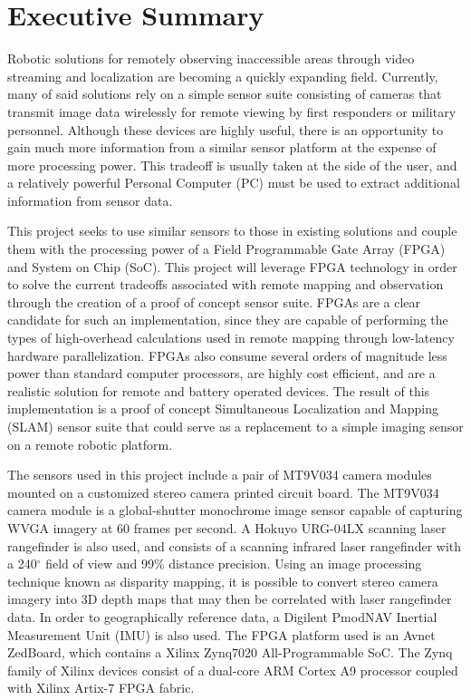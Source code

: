 {}
\section*{Executive Summary}

Robotic solutions for remotely observing inaccessible areas through video streaming and localization are becoming a quickly expanding field. Currently, many of said solutions rely on a simple sensor suite consisting of cameras that transmit image data wirelessly for remote viewing by first responders or military personnel. Although these devices are highly useful, there is an opportunity to gain much more information from a similar sensor platform at the expense of more processing power. This tradeoff is usually taken at the side of the user, and a relatively powerful Personal Computer (PC) must be used to extract additional information from sensor data. 
\par
This project seeks to use similar sensors to those in existing solutions and couple them with the processing power of a Field Programmable Gate Array (FPGA) and System on Chip (SoC). This project will leverage FPGA technology in order to solve the current tradeoffs associated with remote mapping and observation through the creation of a proof of concept sensor suite. FPGAs are a clear candidate for such an implementation, since they are capable of performing the types of high-overhead calculations used in remote mapping through low-latency hardware parallelization. FPGAs also consume several orders of magnitude less power than standard computer processors, are highly cost efficient, and are a realistic solution for remote and battery operated devices. The result of this implementation is a proof of concept Simultaneous Localization and Mapping (SLAM) sensor suite that could serve as a replacement to a simple imaging sensor on a remote robotic platform. 
\par
The sensors used in this project include a pair of MT9V034 camera modules mounted on a customized stereo camera printed circuit board. The MT9V034 camera module is a global-shutter monochrome image sensor capable of capturing WVGA imagery at 60 frames per second. A Hokuyo URG-04LX scanning laser rangefinder is also used, and consists of a scanning infrared laser rangefinder with a 240$^\circ$ field of view and 99\% distance precision. Using an image processing technique known as disparity mapping, it is possible to convert stereo camera imagery into 3D depth maps that may then be correlated with laser rangefinder data. In order to geographically reference data, a Digilent PmodNAV Inertial Measurement Unit (IMU) is also used. The FPGA platform used is an Avnet ZedBoard, which contains a Xilinx Zynq7020 All-Programmable SoC. The Zynq family of Xilinx devices consist of a dual-core ARM Cortex A9 processor coupled with Xilinx Artix-7 FPGA fabric.
